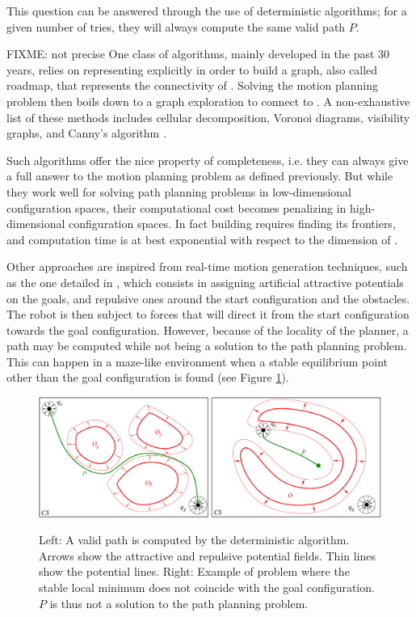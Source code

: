 This question can be answered through the use of deterministic
algorithms; for a given number of tries, they will always compute the
same valid path $P$.

FIXME: not precise
One class of algorithms, mainly developed in the past 30 years, relies
on representing \cobs explicitly in order to build a graph, also
called roadmap, that represents the connectivity of \cfree. Solving
the motion planning problem then boils down to a graph exploration to
connect  to . A non-exhaustive list of these
methods includes cellular decomposition, Voronoi diagrams, visibility
graphs, and Canny's algorithm \cite{good04}.

Such algorithms offer the nice property of completeness, i.e. they can
always give a full answer to the motion planning problem as defined
previously. But while they work well for solving path planning
problems in low-dimensional configuration spaces, their computational
cost becomes penalizing in high-dimensional configuration spaces. In
fact building \cfree requires finding its frontiers, and computation
time is at best exponential with respect to the dimension of \cspace.

Other approaches are inspired from real-time motion generation
techniques, such as the one detailed in \cite{khat85}, which consists
in assigning artificial attractive potentials on the goals, and
repulsive ones around the start configuration and the obstacles. The
robot is then subject to forces that will direct it from the start
configuration towards the goal configuration. However, because of the
locality of the planner, a path may be computed while not being a
solution to the path planning problem. This can happen in a maze-like
environment when a stable equilibrium point other than the goal
configuration is found (see Figure
\ref{fig:chap1-deterministic-algorithm}).

\begin{figure}
  \centering
      {\includegraphics[width = \linewidth]
        {src/chap1-path-optimization/deterministic-algorithm.pdf}}
      \caption{Left: A valid path is computed by the deterministic
        algorithm. Arrows show the attractive and repulsive potential
        fields. Thin lines show the potential lines. Right: Example of
        problem where the stable local minimum does not coincide with
        the goal configuration. $P$ is thus not a solution to the path
        planning problem.}
      \label{fig:chap1-deterministic-algorithm}
\end{figure}

